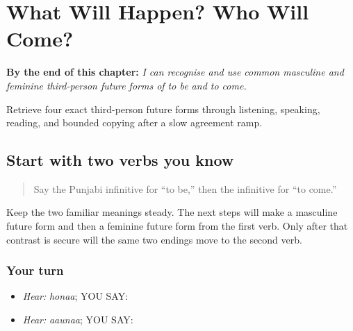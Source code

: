 
\chapter{What Will Happen? Who Will Come?}
\label{ch:pa-a2-third-person-future}

\begin{chapteropening}
\textbf{By the end of this chapter:} \emph{I can recognise and use common masculine and feminine third-person future forms of to be and to come.}

Retrieve four exact third-person future forms through listening, speaking, reading, and bounded copying after a slow agreement ramp.
\end{chapteropening}

\section[(future base review)]{Start with two verbs you know}

\label{lesson:PA-C186-future-return}



\begin{quote}
Say the Punjabi infinitive for “to be,” then the infinitive for “to come.”
\end{quote}

\begin{grammarlens}[title={Grammar Lens: one future contrast at a time}]
Keep the two familiar meanings steady. The next steps will make a masculine future form and then a feminine future form from the first verb. Only after that contrast is secure will the same two endings move to the second verb.
\end{grammarlens}

\subsection*{Your turn}
\begin{itemize}
\raggedright
  \item \emph{Hear:} \emph{honaa}; YOU SAY: \textbf{}
  \item \emph{Hear:} \emph{aaunaa}; YOU SAY: \textbf{}
\end{itemize}

